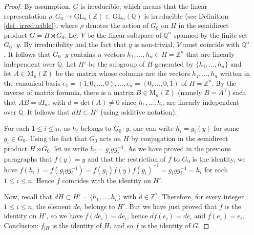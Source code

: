 \documentclass[10pt,a4paper]{amsart}
\renewcommand{\leq}{\leqslant}
\begin{document}
\begin{proof}
\smallskip \noindent
By assumption, $G$ is irreducible, which means that the linear representation $\rho : G_0\rightarrow \mathrm{GL}_n(\mathbb{Z})\subset \mathrm{GL}_n(\mathbb{Q})$ is irreducible (see Definition \ref{def_irreducible}), where $\rho$ denotes the action of $G_0$ on $H$ in the semidirect product $G=H\rtimes G_0$.  Let $V$ be the linear subspace of $\mathbb{Q}^n$ spanned by the finite set $G_0\cdot y$. By irreducibility and the fact that $y$ is non-trivial, $V$ must coincide with $\mathbb{Q}^n$. It follows that $G_0\cdot y$ contains $n$ vectors $h_1,\ldots, h_n\in H=\mathbb{Z}^n$ that are linearly independent over $\mathbb{Q}$. Let $H'$ be the subgroup of $H$ generated by $\lbrace h_1,\ldots, h_n\rbrace$ and let $A\in \mathrm{M}_n(\mathbb{Z})$ be the matrix whose columns are the vectors $h_1,\ldots,h_n$ written in the canonical basis $e_1=(1,0,\ldots,0),\ldots,e_n=(0,\ldots,0,1)$ of $H=\mathbb{Z}^n$. By the inverse of matrix formula, there is a matrix $B\in \mathrm{M}_n(\mathbb{Z})$ (namely $B=A^\intercal$) such that $AB=dI_n$, with $d=\mathrm{det}(A)\neq 0$ since $h_1,\ldots, h_n$ are linearly independent over $\mathbb{Q}$. It follows that $dH\subset H'$ (using additive notation).



\smallskip \noindent
For each $1\leq i\leq n$, as $h_i$ belongs to $G_0\cdot y$, one can write $h_i=g_i(y)$ for some $g_i\in G_0$. Using the fact that $G_0$ acts on $H$ by conjugation in the semidirect product $H\rtimes G_0$, let us write $h_i=g_iyg_i^{-1}$. As we have proved in the previous paragraphs that $f(y)=y$ and that the restriction of $f$ to $G_0$ is the identity, we have $f(h_i)=f(g_iyg_i^{-1})=f(g_i)f(y)f(g_i)^{-1}=g_iyg_i^{-1}=h_i$ for each $1\leq i\leq n$. Hence $f$ coincides with the identity on $H'$.

\smallskip \noindent
Now, recall that $dH\subset H'=\langle h_1,\ldots,h_n\rangle$ with $d\in\mathbb{Z}^{\ast}$. Therefore, for every integer $1\leq i\leq n$, the element $de_i$ belongs to $H'$. But we have just proved that $f$ is the identity on $H'$, so we have $f(de_i)=de_i$, hence $df(e_i)=de_i$ and $f(e_i)=e_i$. Conclusion: $f_{\vert H}$ is the identity of $H$, and so $f$ is the identity of $G$.\end{proof}
\end{document}
